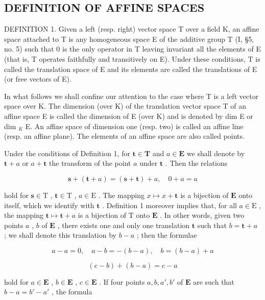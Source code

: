 \subsection{DEFINITION OF AFFINE SPACES}

DEFINITION 1. Given a left (resp. right) vector space T over a field K, an affine space attached to T is any homogeneous space E of the additive group T (I, §5, no. 5) such that 0 is the only operator in T leaving invariant all the elements of E (that is, T operates faithfully and transitively on E). Under these conditions, T is called the translation space of E and its elements are called the translations of E (or free vectors of E).

In what follows we shall confine our attention to the case where T is a left vector space over K. The dimension (over K) of the translation vector space T of an affine space E is called the dimension of E (over K) and is denoted by dim E or dim \(_{K}\) E. An affine space of dimension one (resp. two) is called an affine line (resp. an affine plane). The elements of an affine space are also called points.

Under the conditions of Definition 1, for \(\mathbf{t} \in \mathbf{T}\) and \(a \in \mathbf{E}\) we shall denote by \(\mathbf{t} + a\) or \(a + \mathbf{t}\) the transform of the point \(a\) under \(\mathbf{t}\) . Then the relations

\[
\mathbf {s} + (\mathbf {t} + a) = (\mathbf {s} + \mathbf {t}) + a, \quad 0 + a = a\tag{1}
\]

hold for \(\mathbf{s} \in \mathrm{T}\) , \(\mathbf{t} \in \mathrm{T}\) , \(a \in \mathrm{E}\) . The mapping \(x \mapsto x + \mathbf{t}\) is a bijection of \(\mathbf{E}\) onto itself, which we identify with \(\mathbf{t}\) . Definition 1 moreover implies that, for all \(a \in \mathrm{E}\) , the mapping \(\mathbf{t} \mapsto \mathbf{t} + a\) is a bijection of \(\mathrm{T}\) onto \(\mathbf{E}\) . In other words, given two points \(a\) , \(b\) of \(\mathbf{E}\) , there exists one and only one translation \(\mathbf{t}\) such that \(b = \mathbf{t} + a\) ; we shall denote this translation by \(b - a\) ; then the formulae

\[
a - a = 0, \quad a - b = - (b - a), \quad b = (b - a) + a\tag{2}
\]

\[
(c - b) + (b - a) = c - a
\]

hold for \(a \in \mathbf{E}\) , \(b \in \mathbf{E}\) , \(c \in \mathbf{E}\) . If four points \(a, b, a', b'\) of \(\mathbf{E}\) are such that \(b - a = b' - a'\) , the formula

